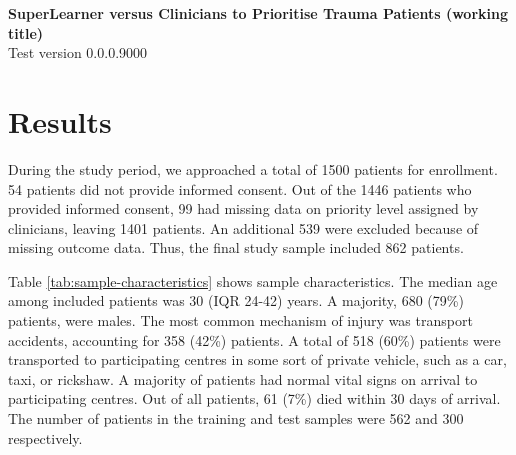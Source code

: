 \documentclass[10pt,letterpaper]{article}\usepackage[]{graphicx}\usepackage[]{color}
\begin{document}
{\Large
  \noindent\textbf{SuperLearner versus Clinicians to Prioritise Trauma Patients (working title)}
} \newline
\\
{\large
  Test version 0.0.0.9000
}
\section*{Results}
During the study period, we approached a total of 1500 patients
for enrollment. 54 patients did
not provide informed consent. Out of the 1446
patients who provided informed consent, 99 had missing data on priority level
assigned by clinicians, leaving 1401
patients. An additional 539 were excluded because of missing outcome
data. Thus, the final study sample included
862 patients.

Table \ref{tab:sample-characteristics} shows sample characteristics. The median
age among included patients was 30 (IQR 24-42) years. A majority,
680 (79\%) patients, were males. The most common mechanism
of injury was transport accidents, accounting for 358 (42\%) patients. A total of 518 (60\%) patients were transported to participating centres in some sort of
private vehicle, such as a car, taxi, or rickshaw. A majority of patients had
normal vital signs on arrival to participating centres. Out of all patients,
61 (7\%) died within 30 days of arrival. The number of
patients in the training and test samples were 562 and
300 respectively.
\end{document}
